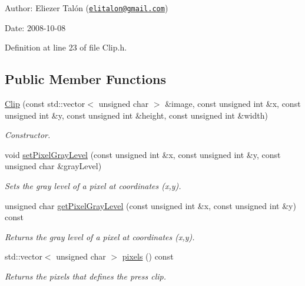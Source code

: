 \begin{Desc}
\item[Author:]Eliezer Talón (\href{mailto:elitalon@gmail.com}{\tt elitalon@gmail.com}) \end{Desc}
\begin{Desc}
\item[Date:]2008-10-08 \end{Desc}


Definition at line 23 of file Clip.h.\subsection*{Public Member Functions}
\begin{CompactItemize}
\item 
\hyperlink{class_clip_7e151616bf9c24c77aa5d1a0d341aa2a}{Clip} (const std::vector$<$ unsigned char $>$ \&image, const unsigned int \&x, const unsigned int \&y, const unsigned int \&height, const unsigned int \&width)
\begin{CompactList}\small\item\em Constructor. \item\end{CompactList}\item 
void \hyperlink{class_clip_454ff6070d0918e56a09a3f28ff430c3}{setPixelGrayLevel} (const unsigned int \&x, const unsigned int \&y, const unsigned char \&grayLevel)
\begin{CompactList}\small\item\em Sets the gray level of a pixel at coordinates (x,y). \item\end{CompactList}\item 
unsigned char \hyperlink{class_clip_334577b60ef51e42f977f952a29d1b66}{getPixelGrayLevel} (const unsigned int \&x, const unsigned int \&y) const 
\begin{CompactList}\small\item\em Returns the gray level of a pixel at coordinates (x,y). \item\end{CompactList}\item 
std::vector$<$ unsigned char $>$ \hyperlink{class_clip_c41089906750f03863854504db8f7e5c}{pixels} () const 
\begin{CompactList}\small\item\em Returns the pixels that defines the press clip. \item\end{CompactList}\item 

\end{CompactItemize}
